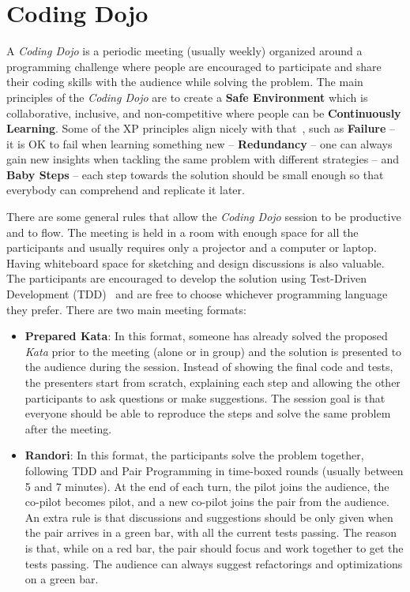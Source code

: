\section{Coding Dojo}\label{sec:dojo}

A \emph{Coding Dojo} is a periodic meeting (usually weekly) organized
around a programming challenge where people are encouraged to
participate and share their coding skills with the audience while
solving the problem. The main principles of the \emph{Coding Dojo} are
to create a \textbf{Safe Environment} which is collaborative,
inclusive, and non-competitive where people can be
\textbf{Continuously Learning}. Some of the XP principles align nicely
with that~\cite{XP2E}, such as \textbf{Failure} -- it is OK to fail
when learning something new -- \textbf{Redundancy} -- one can always
gain new insights when tackling the same problem with different
strategies -- and \textbf{Baby Steps} -- each step towards the
solution should be small enough so that everybody can comprehend and
replicate it later.

There are some general rules that allow the \emph{Coding Dojo} session
to be productive and to flow.  The meeting is held in a room with
enough space for all the participants and usually requires only a
projector and a computer or laptop. Having whiteboard space for
sketching and design discussions is also valuable. The participants
are encouraged to develop the solution using Test-Driven Development
(TDD)~\cite{TDD} and are free to choose whichever programming language
they prefer. There are two main meeting formats:

\begin{itemize}
\item \textbf{Prepared Kata}: In this format, someone has already
  solved the proposed \emph{Kata} prior to the meeting (alone or in
  group) and the solution is presented to the audience during the
  session.  Instead of showing the final code and tests, the
  presenters start from scratch, explaining each step and allowing the
  other participants to ask questions or make suggestions. The session
  goal is that everyone should be able to reproduce the steps and
  solve the same problem after the meeting.
	
\item \textbf{Randori}: In this format, the participants solve the
  problem together, following TDD and Pair Programming in time-boxed
  rounds (usually between 5 and 7 minutes). At the end of each turn,
  the pilot joins the audience, the co-pilot becomes pilot, and a new
  co-pilot joins the pair from the audience. An extra rule is that
  discussions and suggestions should be only given when the pair
  arrives in a green bar, with all the current tests passing. The
  reason is that, while on a red bar, the pair should focus and work
  together to get the tests passing. The audience can always suggest
  refactorings and optimizations on a green bar.
\end{itemize}

